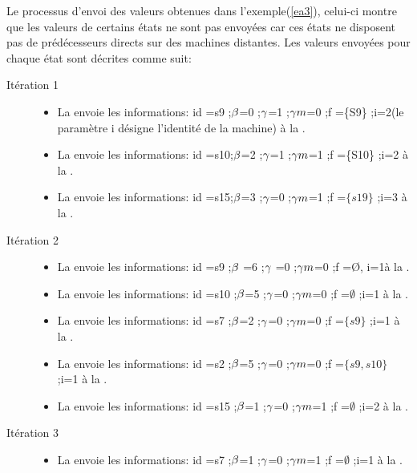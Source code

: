 \begin{Exemple}\label{ea4}
	Le processus d'envoi des valeurs obtenues dans l'exemple(\ref{ea3}), celui-ci montre que les valeurs de certains états ne sont pas envoyées car ces états ne disposent pas de prédécesseurs directs sur des machines distantes.  Les valeurs envoyées pour chaque état sont décrites comme suit:
	\begin{description}
	\item[Itération 1]
		\begin{itemize}
		\item La \mtwo{} envoie les informations: id =s9 ;$\beta{}$=0 ;$\gamma{}$=1 ;$\gamma m{}$=0 ;f =\{S9\} ;i=2(le paramètre i désigne l'identité de la machine)  à la \mone{}.
		\item La \mtwo{} envoie les informations: id =s10;$\beta{}$=2 ;$\gamma{}$=1 ;$\gamma m{}$=1 ;f =\{S10\} ;i=2	 à la \mone{}.
		\item La \mtree{} envoie les informations: id =s15;$\beta{}$=3 ;$\gamma{}$=0 ;$\gamma m{}$=1 ;f =$\{s19\}$ ;i=3	 à la \mtwo{}.
		\end{itemize}
	\item[Itération 2]
		\begin{itemize}
			\item La \mone{} envoie les informations: id =s9 ;$\beta{}$ =6 ;$\gamma{}$ =0 ;$\gamma m{}$=0 ;f =Ø, i=1à la \mtwo{}.
			\item  La \mone{} envoie les informations: id =s10 ;$\beta{}$=5 ;$\gamma{}$=0 ;$\gamma m{}$=0 ;f =$\emptyset$ ;i=1 à la \mtwo{}.
			\item  La \mone{} envoie les informations: id =s7 ;$\beta{}$=2 ;$\gamma{}$=0 ;$\gamma m{}$=0 ;f =$\{s9\}$ ;i=1 à la \mtwo{}.
			\item  La \mone{} envoie les informations: id =s2 ;$\beta{}$=5 ;$\gamma{}$=0 ;$\gamma m{}$=0 ;f =$\{s9,s10\}$ ;i=1 à la \mtree{}.
			\item  La \mtwo{} envoie les informations: id =s15 ;$\beta{}$=1 ;$\gamma{}$=0 ;$\gamma m{}$=1 ;f =$\emptyset$ ;i=2 à la \mtree{}.
			\end{itemize}	
\item[Itération 3]
		\begin{itemize}
			\item  La \mtwo{} envoie les informations: id =s7 ;$\beta{}$=1 ;$\gamma{}$=0 ;$\gamma m{}$=1 ;f =$\emptyset$ ;i=1 à la \mone{}.

\end{itemize}
\end{description}
\end{Exemple}
